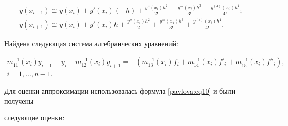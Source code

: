 \begin{gather*}

 y(x_{i-1})\cong y(x_i)+y'(x_i)(-h)+\frac{y''(x_i

)h^2}{2!}-\frac{y'''(x_i)h^3}{3!}+\frac{y^{(4)}(x_i)h^4}{4!}; \\

y(x_{i+1})\cong y(x_i) + y'(x_i)h + \frac{y''(x_i)h^2}{2}+\frac{y'''(x_i

)h^3}{3!}+\frac{y^{(4)}(x_i)h^4}{4!}.

\end{gather*}

Найдена следующая система алгебраических уравнений:

\begin{multline*}

m_{11}^{-1} (x_i) y_{i-1} -y_i + m_{12}^{-1} (x_i)y_{i+1} =- \left(m_{13}^{-1}

(x_i)f_i +m_{14}^{-1} (x_i)f'_i +m_{15}^{-1} (x_i)f''_i \right), \\

i=1,\ldots,n-1.

\end{multline*}

%











%

Для оценки аппроксимации использовалась формула \eqref{pavlova:eq10} и были получены

следующие оценки:

